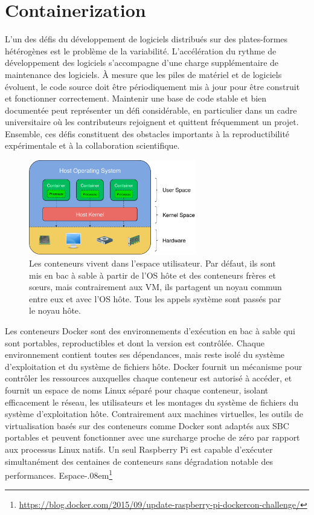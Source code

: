 \section{Containerization}\label{sec:containerization}

L'un des défis du développement de logiciels distribués sur des plates-formes hétérogènes est le problème de la variabilité. L'accélération du rythme de développement des logiciels s'accompagne d'une charge supplémentaire de maintenance des logiciels. À mesure que les piles de matériel et de logiciels évoluent, le code source doit être périodiquement mis à jour pour être construit et fonctionner correctement. Maintenir une base de code stable et bien documentée peut représenter un défi considérable, en particulier dans un cadre universitaire où les contributeurs rejoignent et quittent fréquemment un projet. Ensemble, ces défis constituent des obstacles importants à la reproductibilité expérimentale et à la collaboration scientifique.

\begin{figure}[ht]
\centrer
\includegraphics[width=0.65\textwidth]{../figures/user_kernel_hardware.png}
\caption{Les conteneurs vivent dans l'espace utilisateur. Par défaut, ils sont mis en bac à sable à partir de l'OS hôte et des conteneurs frères et sœurs, mais contrairement aux VM, ils partagent un noyau commun entre eux et avec l'OS hôte. Tous les appels système sont passés par le noyau hôte.}
\label{fig:user_kernel_hardware}
\end{figure}

Les conteneurs Docker sont des environnements d'exécution en bac à sable qui sont portables, reproductibles et dont la version est contrôlée. Chaque environnement contient toutes ses dépendances, mais reste isolé du système d'exploitation et du système de fichiers hôte. Docker fournit un mécanisme pour contrôler les ressources auxquelles chaque conteneur est autorisé à accéder, et fournit un espace de noms Linux séparé pour chaque conteneur, isolant efficacement le réseau, les utilisateurs et les montages du système de fichiers du système d'exploitation hôte. Contrairement aux machines virtuelles, les outils de virtualisation basés sur des conteneurs comme Docker sont adaptés aux SBC portables et peuvent fonctionner avec une surcharge proche de zéro par rapport aux processus Linux natifs. Un seul Raspberry Pi est capable d'exécuter simultanément des centaines de conteneurs sans dégradation notable des performances. Espace{-.08em}\footnote{\url{https://blog.docker.com/2015/09/update-raspberry-pi-dockercon-challenge/}}

